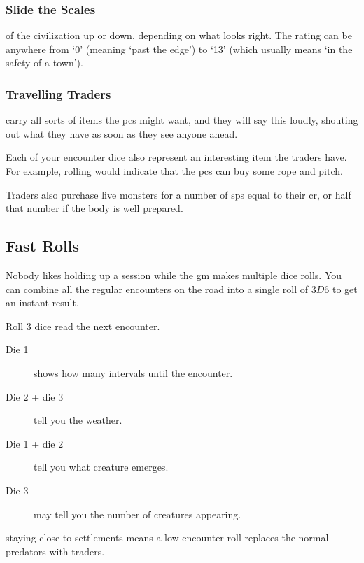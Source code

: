 \begin{multicols}{2}
\subsubsection{Slide the Scales}
of the civilization up or down, depending on what looks right.
The rating can be anywhere from `0' (meaning `past the \gls{edge}') to `13' (which usually means `in the safety of a town').

\subsubsection{Travelling Traders}
\label{traders}
carry all sorts of items the \glspl{pc} might want, and they will say this loudly, shouting out what they have as soon as they see anyone ahead.

\encTraders

Each of your encounter dice also represent an interesting item the traders have.
For example, rolling  would indicate that the \glspl{pc} can buy some rope and pitch.

Traders also purchase live \glspl{monster} for a number of \glspl{sp} equal to their \gls{cr}, or half that number if the body is well prepared.

\subsection{Fast Rolls}

Nobody likes holding up a session while the \gls{gm} makes multiple dice rolls.
You can combine all the regular encounters on the road into a single roll of $3D6$ to get an instant result.

\begin{description}
  \item
  Roll 3 dice read the next encounter.
  \begin{description}
    \item[Die 1]
    shows how many \glspl{interval} until the encounter.
    \item[Die 2 + die 3]
    tell you the weather.
    \item[Die 1 + die 2]
    tell you what creature emerges.
    \item[Die 3]
    may tell you the number of creatures appearing.
  \end{description}
  \item[During the day]
  staying close to settlements means a low encounter roll replaces the normal predators with traders.


\end{description}
\end{multicols}
